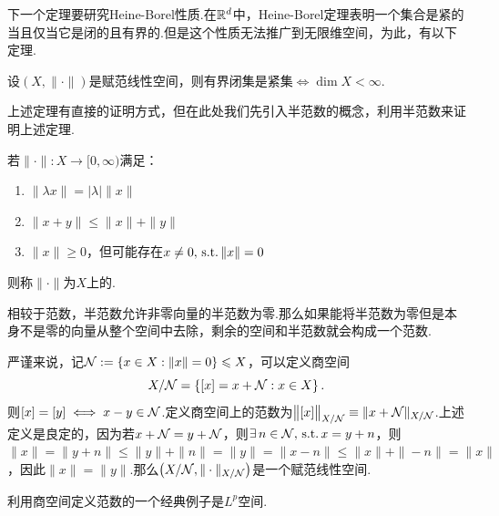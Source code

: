 下一个定理要研究Heine-Borel性质.在$\mathbb{R}^d$中，Heine-Borel定理表明一个集合是紧的当且仅当它是闭的且有界的.但是这个性质无法推广到无限维空间，为此，有以下定理.
\begin{theorem}[]
    设$(X,\|\cdot\|)$是赋范线性空间，则有界闭集是紧集$\iff\dim X<\infty$.
\end{theorem}
上述定理有直接的证明方式，但在此处我们先引入半范数的概念，利用半范数来证明上述定理.
\begin{definition}[半范数]
    若$\|\cdot\|:X\to [0,\infty)$满足：
    \begin{enumerate}[label=(\roman*)]
        \item $\|\lambda x\|=|\lambda|\|x\|$
        \item $\|x+y\|\leq \|x\|+\|y\|$
        \item $\|x\|\geq 0$，但可能存在$x\neq 0,\operatorname{\,\text{s.t.}} \|x\|=0$
    \end{enumerate}
    则称$\|\cdot\|$为$X$上的.
\end{definition}
相较于范数，半范数允许非零向量的半范数为零.那么如果能将半范数为零但是本身不是零的向量从整个空间中去除，剩余的空间和半范数就会构成一个范数.\par
严谨来说，记$\mathcal{N}:=\left\{x\in X:\|x\|=0\right\}\leqslant X$，可以定义商空间
\begin{equation*}
X/\mathcal{N}=\left\{[x]=x+\mathcal{N}:x\in X\right\}.
\end{equation*}
则$[x]=[y]\iff x-y\in\mathcal{N}$.定义商空间上的范数为$\big\|[x]\big\|_{X/\mathcal{N}}\equiv\|x+\mathcal{N}\|_{X/\mathcal{N}}$.上述定义是良定的，因为若$x+\mathcal{N}=y+\mathcal{N}$，则$\exists\, n\in\mathcal{N},\operatorname{\,\text{s.t.}} x=y+n$，则$\|x\|=\|y+n\|\leq \|y\|+\|n\|=\|y\|=\|x-n\|\leq\|x\|+\|-n\|=\|x\|$，因此$\|x\|=\|y\|$.那么$\left(X/\mathcal{N},\|\cdot\|_{X/\mathcal{N}}\right)$是一个赋范线性空间.\par
利用商空间定义范数的一个经典例子是$L^p$空间.

